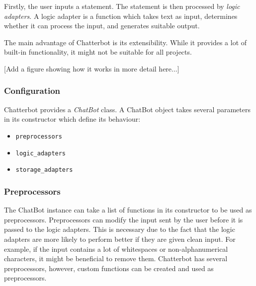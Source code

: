 \documentclass[12pt,a4paper]{article}
\begin{document}
Firstly, the user inputs a statement. The statement is then processed by \textit{logic adapters}. A logic adapter is a function which takes text as input, determines whether it can process the input, and generates suitable output.

The main advantage of Chatterbot is its extensibility. While it provides a lot of built-in functionality, it might not be suitable for all projects.

[Add a figure showing how it works in more detail here...]

\subsubsection{Configuration}
Chatterbot provides a \textit{ChatBot} class. A ChatBot object takes several parameters in its constructor which define its behaviour:
\begin{itemize}
    \item \texttt{preprocessors}
    \item \texttt{logic\_adapters}
    \item \texttt{storage\_adapters}
\end{itemize}

\subsubsection{Preprocessors}
The ChatBot instance can take a list of functions in its constructor to be used as preprocessors. Preprocessors can modify the input sent by the user before it is passed to the logic adapters. This is necessary due to the fact that the logic adapters are more likely to perform better if they are given clean input. For example, if the input contains a lot of whitespaces or non-alphanumerical characters, it might be beneficial to remove them. Chatterbot has several preprocessors, however, custom functions can be created and used as preprocessors.
\end{document}
